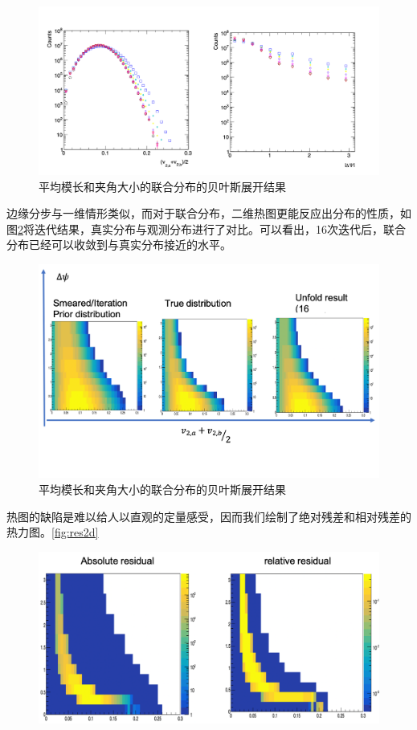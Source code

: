 \documentclass[aps,pre,12pt,preprint,onecolumn,showpacs,showkeys]{revtex4-1}
\begin{document}
\begin{enumerate}
\begin{figure}[htbp]
    \centering
    \includegraphics[width=140mm]{2d_vp_the.png}
    \caption{平均模长和夹角大小的联合分布的贝叶斯展开结果\label{fig:bu2d}}%
    \end{figure}
    边缘分步与一维情形类似，而对于联合分布，二维热图更能反应出分布的性质，如图\ref{fig:bu2dc}将迭代结果，真实分布与观测分布进行了对比。可以看出，16次迭代后，联合分布已经可以收敛到与真实分布接近的水平。\par
    \begin{figure}[htbp]
        \centering
        \includegraphics[width=140mm]{2d_vp_the_compare.png}
        \caption{平均模长和夹角大小的联合分布的贝叶斯展开结果\label{fig:bu2dc}}%
        \end{figure}
    热图的缺陷是难以给人以直观的定量感受，因而我们绘制了绝对残差和相对残差的热力图。\ref{fig:res2d}\par
    \begin{figure}[htbp]
        \centering
        \includegraphics[width=140mm]{res.png}

\end{figure}
\end{enumerate}
\end{document}

